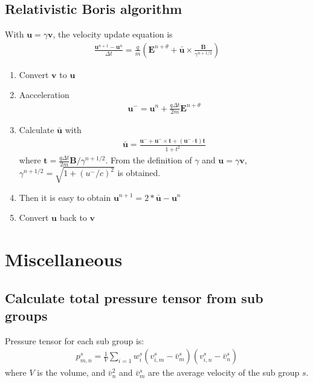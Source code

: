 \documentclass[a4paper, 11pt]{article}
\begin{document}
\subsection{Relativistic Boris algorithm}

With $\mathbf{u} = \gamma \mathbf{v}$, the velocity update equation is
\begin{eqnarray}
\frac{\mathbf{u}^{n+1} - \mathbf{u}^{n}}{\Delta t} = \frac{q}{m}(\mathbf{E}^{n+\theta} + \bar{\mathbf{u}}\times \frac{\mathbf{B}}{\gamma ^{n+1/2}})
\end{eqnarray}

\begin{enumerate}
    \item Convert $\mathbf{v}$ to $\mathbf{u}$
    \item Aacceleration
\begin{eqnarray}
    \mathbf{u}^- = \mathbf{u}^{n} + \frac{q\Delta t}{2m}\mathbf{E}^{n+\theta}
\end{eqnarray}

\item Calculate $\bar{\mathbf{u}}$ with
\begin{eqnarray}
\bar{\mathbf{u}} = \frac{\mathbf{u}^- + \mathbf{u}^- \times \mathbf{t} + (\mathbf{u}^- \cdot \mathbf{t})\mathbf{t}}{1+t^2}
\end{eqnarray}
where $\mathbf{t} = \frac{q\Delta t}{2m} \mathbf{B}/\gamma^{n+1/2}$. From the definition of $\gamma$ and $\mathbf{u} = \gamma \mathbf{v}$, $\gamma ^{n+1/2} = \sqrt{1+(u^-/c)^2}$ is obtained. 

\item Then it is easy to obtain $\mathbf{u}^{n+1} = 2*\bar{\mathbf{u}} - \mathbf{u}^{n}$
\item  Convert $\mathbf{u}$ back to $\mathbf{v}$
\end{enumerate}

\section{Miscellaneous}
\subsection{Calculate total pressure tensor from sub groups}
Pressure tensor for each sub group is:
\begin{eqnarray}
    p^s_{m,n} = \frac{1}{V} \sum_{i=1} w_i^s (v_{i,m}^s-\bar{v}_m^s) (v_{i,n}^s-\bar{v}_n^s) 
\end{eqnarray}
where $V$ is the volume, and $\bar{v}_n^2$ and $\bar{v}_m^s$ are the average velocity of the sub group $s$. 
\end{document}
